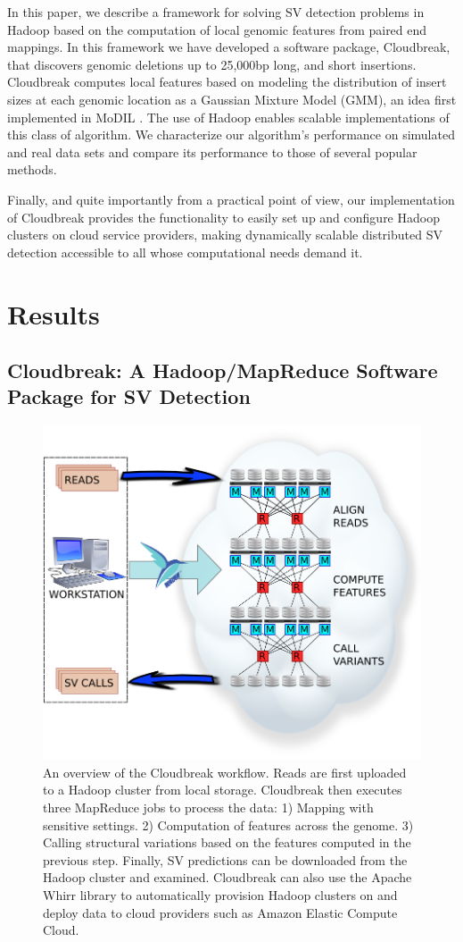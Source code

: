 \documentclass[11pt]{article}
\begin{document}
In this paper, we describe a framework for solving SV detection problems in Hadoop based on the computation of local genomic features from paired end mappings. In this framework we have developed a software package, Cloudbreak, that discovers genomic deletions up to 25,000bp long, and short insertions. Cloudbreak computes local features based on modeling the distribution of insert sizes at each genomic location as a Gaussian Mixture Model (GMM), an idea first implemented in MoDIL \autocite{Lee:2009da}. The use of Hadoop enables scalable implementations of this class of algorithm. We characterize our algorithm's performance on simulated and real data sets and compare its performance to those of several popular methods. 

Finally, and quite importantly from a practical point of view, our implementation of Cloudbreak provides the functionality to easily set up and configure Hadoop clusters on cloud service providers, making dynamically scalable distributed SV detection accessible to all whose computational needs demand it.

\section{Results}

\subsection{Cloudbreak: A Hadoop/MapReduce Software Package for SV Detection}

\begin{figure}
\centering
\includegraphics[width=.8\textwidth]{../figures/workflow_with_whirr.png}
\caption{An overview of the Cloudbreak workflow. Reads are first uploaded to a Hadoop cluster from local storage. Cloudbreak then executes three MapReduce jobs to process the data: 1) Mapping with sensitive settings. 2) Computation of features across the genome. 3) Calling structural variations based on the features computed in the previous step. Finally, SV predictions can be downloaded from the Hadoop cluster and examined. Cloudbreak can also use the Apache Whirr library to automatically provision Hadoop clusters on and deploy data to cloud providers such as Amazon Elastic Compute Cloud.}
\label{cloudbreak_workflow}
\end{figure}
\end{document}
